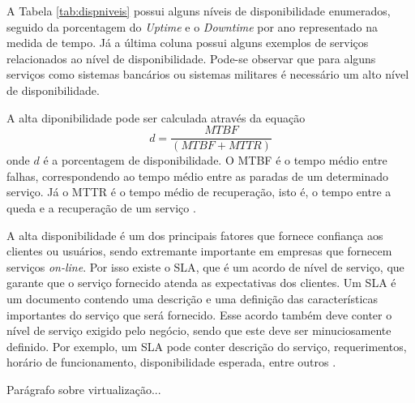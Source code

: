 A Tabela \ref{tab:dispniveis} possui alguns níveis de disponibilidade enumerados, seguido da porcentagem do \textit{Uptime} e 
o \textit{Downtime} por ano representado na medida de tempo.
Já a última coluna possui alguns exemplos de serviços relacionados ao nível de disponibilidade. 
Pode-se observar que para alguns serviços como sistemas bancários ou sistemas militares é necessário um alto nível de disponibilidade.

A alta diponibilidade pode ser calculada através da equação
\begin{equation}
d = \frac{MTBF}{(MTBF + MTTR)}
\label{diponibilidade}
\end{equation}
onde $d$ é a porcentagem de disponibilidade. O \ac{MTBF} é o tempo médio entre falhas, correspondendo ao 
tempo médio entre as paradas de um determinado serviço. Já o \ac{MTTR} é o tempo médio de recuperação, isto é, 
o tempo entre a queda e a recuperação de um serviço \cite{goncalves2009}.

A alta disponibilidade é um dos principais fatores que fornece confiança aos clientes ou usuários, sendo extremante importante em empresas 
que fornecem serviços \textit{on-line}. Por isso existe o \ac{SLA}, que é um acordo de nível de serviço, 
que garante que o serviço fornecido atenda as expectativas dos clientes. Um \ac{SLA} é um documento contendo uma descrição e uma definição 
das características importantes do serviço que será fornecido. Esse acordo também deve conter o nível de serviço exigido pelo negócio, 
sendo que este deve ser minuciosamente definido. Por exemplo, um \ac{SLA} pode conter descrição do serviço, requerimentos, horário de funcionamento,
disponibilidade esperada, entre outros \cite{smith2010}.

Parágrafo sobre virtualização...

